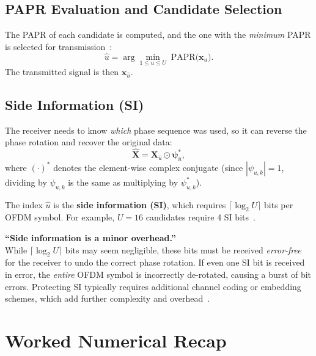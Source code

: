 \subsection{PAPR Evaluation and Candidate Selection}

The PAPR of each candidate is computed, and the one with the
\emph{minimum} PAPR is selected for transmission~\cite{ali2016new}:
\begin{equation}
    \hat{u} = \arg\min_{1 \le u \le U}\;
    \mathrm{PAPR}\bigl(\bm{x}_u\bigr).
    \label{eq:slm_selection}
\end{equation}
The transmitted signal is then $\bm{x}_{\hat{u}}$.

\subsection{Side Information (SI)}

The receiver needs to know \emph{which} phase sequence was used, so it can
reverse the phase rotation and recover the original data:
\begin{equation}
    \hat{\bm{X}} = \bm{X}_{\hat{u}} \odot \bm{\psi}_{\hat{u}}^{*},
    \label{eq:slm_recovery}
\end{equation}
where $(\cdot)^{*}$ denotes the element-wise complex conjugate
(since $|\psi_{u,k}|=1$, dividing by $\psi_{u,k}$ is the same as multiplying
by $\psi_{u,k}^{*}$).

The index $\hat{u}$ is the \textbf{side information (SI)}, which requires
$\lceil\log_2 U\rceil$ bits per OFDM symbol.  For example,
$U=16$ candidates require 4 SI bits~\cite{ali2016new,da2024survey}.

\begin{misconception}
    \textbf{``Side information is a minor overhead.''} \\
    While $\lceil\log_2 U\rceil$ bits may seem negligible, these bits must be
    received \emph{error-free} for the receiver to undo the correct phase
    rotation.  If even one SI bit is received in error, the \emph{entire}
    OFDM symbol is incorrectly de-rotated, causing a burst of bit errors.
    Protecting SI typically requires additional channel coding or embedding
    schemes, which add further complexity and overhead~\cite{da2024survey}.
\end{misconception}


\section{Worked Numerical Recap}
\label{sec:worked_example}

